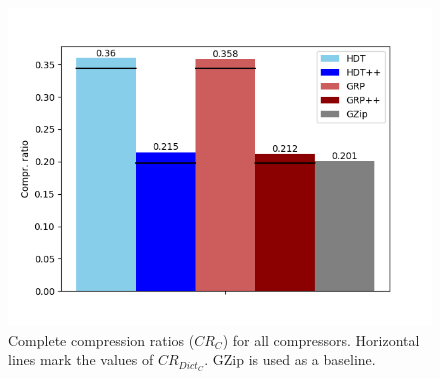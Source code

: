 \begin{figure}
	\centering
	\includegraphics[width=0.8\linewidth]{figures/4_evaluation/final/completecompr}
	\caption{Complete compression ratios ($CR_C$) for all compressors. Horizontal lines mark the values of $CR_{Dict_C}$. GZip is used as a baseline.}
	\label{fig:completecompr}
\end{figure}
















